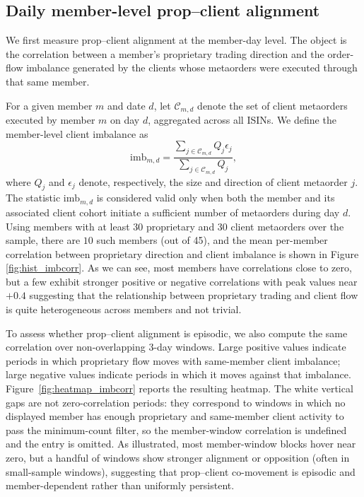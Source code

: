 \documentclass[11pt]{article}
\begin{document}
\subsection{Daily member-level prop--client alignment}
\label{subsec:member_level_crowding}
We first measure prop--client alignment at the member-day level. The object is the correlation
between a member's proprietary trading direction and the order-flow imbalance generated by the
clients whose metaorders were executed through that same member.

For a given member $m$ and date $d$, let $\mathcal{C}_{m,d}$ denote the set of client metaorders executed 
by member $m$ on day $d$, aggregated across all ISINs. We define the member-level client imbalance as
\begin{equation}
\text{imb}_{m,d}
  = \frac{\sum_{j \in \mathcal{C}_{m,d}} Q_j \epsilon_j}
         {\sum_{j \in \mathcal{C}_{m,d}} Q_j},
\end{equation}
where $Q_j$ and $\epsilon_j$ denote, respectively, the size and direction of client metaorder $j$.
The statistic $\text{imb}_{m,d}$ is considered valid only when both the member and its associated 
client cohort initiate a sufficient number of metaorders during day $d$. Using members with at least 30 proprietary and 
30 client metaorders over the sample, there are $10$ such members (out of 45), and the mean per-member correlation 
between proprietary direction and client imbalance is shown in Figure \ref{fig:hist_imbcorr}. As we can see,
most members have correlations close to zero, but a few exhibit stronger positive or negative correlations with
peak values near $+0.4$ suggesting 
that the relationship between proprietary trading and client flow is quite heterogeneous across members and not trivial.


To assess whether prop--client alignment is episodic, we also compute the same correlation over
non-overlapping 3-day windows. Large positive values indicate periods in which proprietary flow
moves with same-member client imbalance; large negative values indicate periods in which it moves
against that imbalance. Figure~\ref{fig:heatmap_imbcorr} reports the resulting heatmap. 
The white vertical gaps are not zero-correlation periods: they correspond to windows in which no displayed member has
enough proprietary and same-member client activity to pass the minimum-count filter, so the member-window correlation is undefined and the entry is omitted.
As illustrated, most member-window blocks hover near zero, but a handful of windows show stronger 
alignment or opposition (often in small-sample windows), suggesting that prop--client co-movement is 
episodic and member-dependent rather than uniformly persistent.
\end{document}
